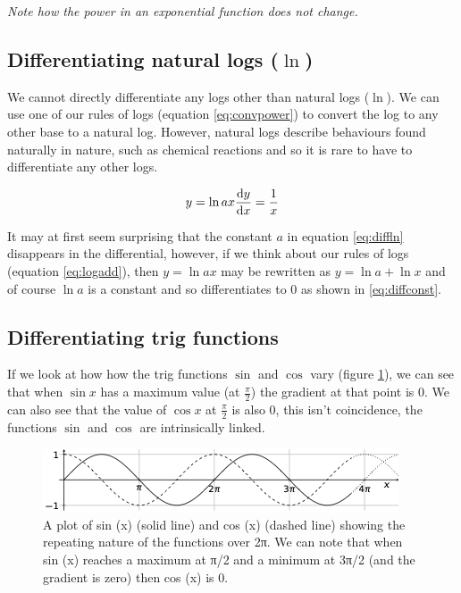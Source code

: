 \documentclass[
]{book}
\begin{document}
\emph{Note how the power in an exponential function does not change.}

\hypertarget{subsec:difflogs}{%
\subsection{\texorpdfstring{Differentiating natural logs (\(\ln\))}{Differentiating natural logs (\textbackslash ln)}}\label{subsec:difflogs}}

We cannot directly differentiate any logs other than natural logs (\(\ln\)). We can use one of our rules of logs (equation \eqref{eq:convpower}) to convert the log to any other base to a natural log. However, natural logs describe behaviours found naturally in nature, such as chemical reactions and so it is rare to have to differentiate any other logs.

\begin{equation}
y = \ln {ax}\\
\frac{\textrm{d}y}{\textrm{d}x}=\frac{1}{x}
\label{eq:diffln}
\end{equation}

It may at first seem surprising that the constant \(a\) in equation \eqref{eq:diffln} disappears in the differential, however, if we think about our rules of logs (equation \eqref{eq:logadd}), then \(y=\ln {ax}\) may be rewritten as \(y = \ln a +\ln x\) and of course \(\ln a\) is a constant and so differentiates to 0 as shown in \eqref{eq:diffconst}.

\hypertarget{subsec:difftrig}{%
\subsection{Differentiating trig functions}\label{subsec:difftrig}}

If we look at how how the trig functions \(\sin\) and \(\cos\) vary (figure \ref{fig:trigcyclic}), we can see that when \(\sin x\) has a maximum value (at \(\frac{\pi}{2}\)) the gradient at that point is 0. We can also see that the value of \(\cos x\) at \(\frac{\pi}{2}\) is also 0, this isn't coincidence, the functions \(\sin\) and \(\cos\) are intrinsically linked.

\begin{figure}

{\centering \includegraphics[width=0.8\linewidth]{images/trigcyclic} 

}

\caption{A plot of sin (x) (solid line) and cos (x) (dashed line) showing the repeating nature of the functions over 2π. We can note that when sin (x) reaches a maximum at π/2 and a minimum at 3π/2 (and the gradient is zero) then cos (x) is 0.}\label{fig:trigcyclic}
\end{figure}
\end{document}
